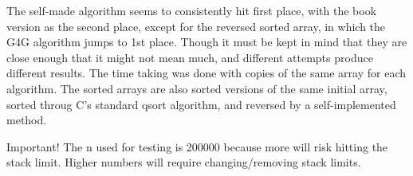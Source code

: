 \documentclass{article}
\begin{document}
    The self-made algorithm seems to consistently hit first place, with the book version as the second place, except for the reversed sorted array, in which the G4G algorithm jumps to 1st place. Though it must be kept in mind that they are close enough that it might not mean much, and different attempts produce different results.
    The time taking was done with copies of the same array for each algorithm. The sorted arrays are also sorted versions of the same initial array, sorted throug C's standard qsort algorithm, and reversed by a self-implemented method.

    Important! The n used for testing is 200000 because more will risk hitting the stack limit. Higher numbers will require changing/removing stack limits.

 
\end{document}
